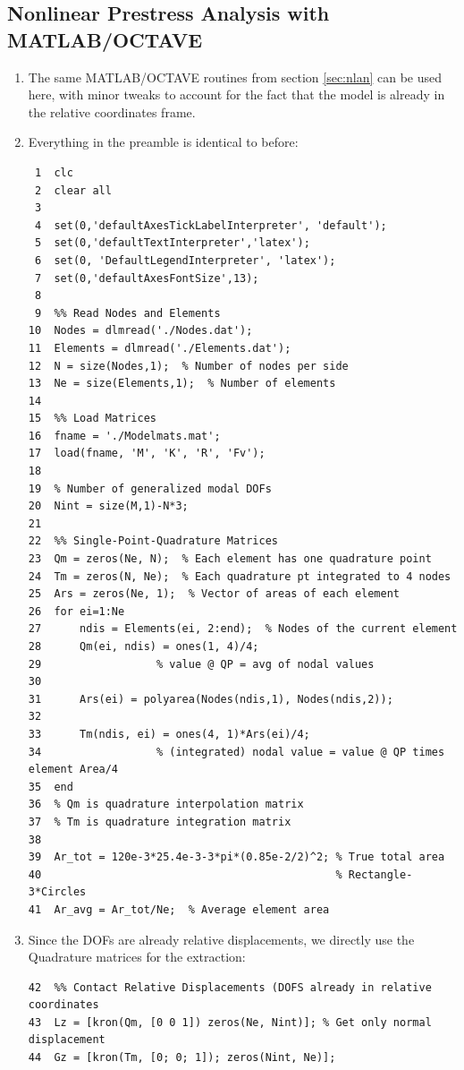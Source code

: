 \documentclass[11pt]{article}
\begin{document}
\subsection{Nonlinear Prestress Analysis with MATLAB/OCTAVE}
\label{sec:org8fe9f7f}
\begin{enumerate}
\item The same MATLAB/OCTAVE routines from section \ref{sec:nlan} can be used here, with minor tweaks to account for the fact that the model is already in the relative coordinates frame.
\item Everything in the preamble is identical to before:
\begin{verbatim}
 1  clc
 2  clear all
 3  
 4  set(0,'defaultAxesTickLabelInterpreter', 'default');
 5  set(0,'defaultTextInterpreter','latex');
 6  set(0, 'DefaultLegendInterpreter', 'latex');
 7  set(0,'defaultAxesFontSize',13);
 8  
 9  %% Read Nodes and Elements
10  Nodes = dlmread('./Nodes.dat');
11  Elements = dlmread('./Elements.dat');
12  N = size(Nodes,1);  % Number of nodes per side
13  Ne = size(Elements,1);  % Number of elements
14  
15  %% Load Matrices
16  fname = './Modelmats.mat';
17  load(fname, 'M', 'K', 'R', 'Fv');
18  
19  % Number of generalized modal DOFs
20  Nint = size(M,1)-N*3;
21  
22  %% Single-Point-Quadrature Matrices
23  Qm = zeros(Ne, N);  % Each element has one quadrature point
24  Tm = zeros(N, Ne);  % Each quadrature pt integrated to 4 nodes
25  Ars = zeros(Ne, 1);  % Vector of areas of each element
26  for ei=1:Ne
27      ndis = Elements(ei, 2:end);  % Nodes of the current element
28      Qm(ei, ndis) = ones(1, 4)/4;
29                  % value @ QP = avg of nodal values
30  
31      Ars(ei) = polyarea(Nodes(ndis,1), Nodes(ndis,2));
32  
33      Tm(ndis, ei) = ones(4, 1)*Ars(ei)/4;
34                  % (integrated) nodal value = value @ QP times element Area/4
35  end
36  % Qm is quadrature interpolation matrix
37  % Tm is quadrature integration matrix
38  
39  Ar_tot = 120e-3*25.4e-3-3*pi*(0.85e-2/2)^2; % True total area
40                                              % Rectangle-3*Circles
41  Ar_avg = Ar_tot/Ne;  % Average element area
\end{verbatim}
\item Since the DOFs are already relative displacements, we directly use the Quadrature matrices for the extraction:
\begin{verbatim}
42  %% Contact Relative Displacements (DOFS already in relative coordinates
43  Lz = [kron(Qm, [0 0 1]) zeros(Ne, Nint)]; % Get only normal displacement
44  Gz = [kron(Tm, [0; 0; 1]); zeros(Nint, Ne)];

\end{verbatim}
\end{enumerate}
\end{document}

